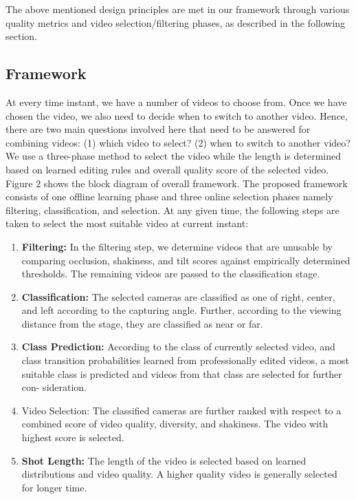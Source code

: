 \documentclass{sig-alternate}
\begin{document}
The above mentioned design principles are met in our framework
through various quality metrics and video selection/filtering phases,
as described in the following section.

\subsection{Framework}
At every time instant, we have a number of videos to choose
from. Once we have chosen the video, we also need to decide when
to switch to another video. Hence, there are two main questions
involved here that need to be answered for combining videos: (1)
which video to select? (2) when to switch to another video? We
use a three-phase method to select the video while the length is
determined based on learned editing rules and overall quality score
of the selected video.\\
Figure 2 shows the block diagram of overall framework. The
proposed framework consists of one offline learning phase and three
online selection phases namely filtering, classification, and selection. At any given time, the following steps are taken to select the
most suitable video at current instant:
\begin{enumerate}
    \item \textbf{Filtering:} In the filtering step, we determine videos that are
unusable by comparing occlusion, shakiness, and tilt scores
against empirically determined thresholds. The remaining
videos are passed to the classification stage.
\item \textbf{Classification:} The selected cameras are classified as one
of right, center, and left according to the capturing angle.
Further, according to the viewing distance from the stage,
they are classified as near or far.

\item \textbf{Class Prediction:} According to the class of currently selected video, and class transition probabilities learned from
professionally edited videos, a most suitable class is predicted and videos from that class are selected for further con-
sideration.

\item{Video Selection:} The classified cameras are further ranked
with respect to a combined score of video quality, diversity,
and shakiness. The video with highest score is selected.

\item \textbf{Shot Length:} The length of the video is selected based on
learned distributions and video quality. A higher quality video
is generally selected for longer time.
\end{enumerate}
\end{document}
